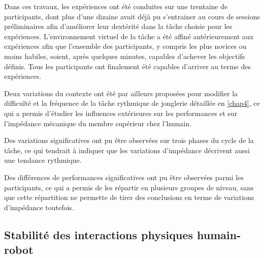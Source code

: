 Dans ces travaux, les expériences ont été conduites sur une trentaine de participants, dont plus d'une dizaine avait déjà pu s'entrainer au cours de sessions préliminaires afin d'améliorer leur dextérité dans la tâche choisie pour les expériences. L'environnement virtuel de la tâche a été affiné antérieurement aux expériences afin que l'ensemble des participants, y compris les plus novices ou moins habiles, soient, après quelques minutes, capables d'achever les objectifs définis. Tous les participants ont finalement été capables d'arriver au terme des expériences.

Deux variations du contexte ont été par ailleurs proposées pour modifier la difficulté et la fréquence de la tâche rythmique de jonglerie détaillée en \cref{chap4}, ce qui a permis d'étudier les influences extérieures sur les performances et sur l'impédance mécanique du membre supérieur chez l'humain. 

\begin{description}[font=$\bullet$,labelindent=.5cm]
	\item Des variations significatives ont pu être observées sur trois phases du cycle de la tâche, ce qui tendrait à indiquer que les variations d'impédance décrivent aussi une tendance rythmique.
	\item Des différences de performances significatives ont pu être observées parmi les participants, ce qui a permis de les répartir en plusieurs groupes de niveau, sans que cette répartition ne permette de tirer des conclusions en terme de variations d'impédance toutefois.
\end{description}

\subsection{Stabilité des interactions physiques humain-robot}

